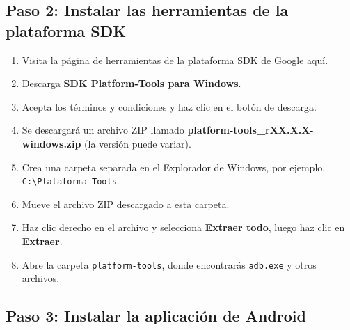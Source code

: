 \documentclass[
  doc,
  floatsintext,
  longtable,
  a4paper,
  nolmodern,
  notxfonts,
  notimes,
  12pt,
  colorlinks=true,linkcolor=blue,citecolor=blue,urlcolor=blue]{apa7}
\providecommand{\tightlist}{%
  \setlength{\itemsep}{0pt}\setlength{\parskip}{0pt}}
\begin{document}
\subsection{Paso 2: Instalar las herramientas de la plataforma
SDK}\label{paso-2-instalar-las-herramientas-de-la-plataforma-sdk}

\begin{enumerate}
\def\labelenumi{\arabic{enumi}.}
\tightlist
\item
  Visita la página de herramientas de la plataforma SDK de Google
  \href{https://developer.android.com/studio/releases/platform-tools.html}{aquí}.
\item
  Descarga \textbf{SDK Platform-Tools para Windows}.
\item
  Acepta los términos y condiciones y haz clic en el botón de descarga.
\item
  Se descargará un archivo ZIP llamado
  \textbf{platform-tools\_rXX.X.X-windows.zip} (la versión puede
  variar).
\item
  Crea una carpeta separada en el Explorador de Windows, por ejemplo,
  \texttt{C:\textbackslash{}Plataforma-Tools}.
\item
  Mueve el archivo ZIP descargado a esta carpeta.
\item
  Haz clic derecho en el archivo y selecciona \textbf{Extraer todo},
  luego haz clic en \textbf{Extraer}.
\item
  Abre la carpeta \texttt{platform-tools}, donde encontrarás
  \texttt{adb.exe} y otros archivos.
\end{enumerate}

\subsection{Paso 3: Instalar la aplicación de
Android}\label{paso-3-instalar-la-aplicaciuxf3n-de-android}
\end{document}

